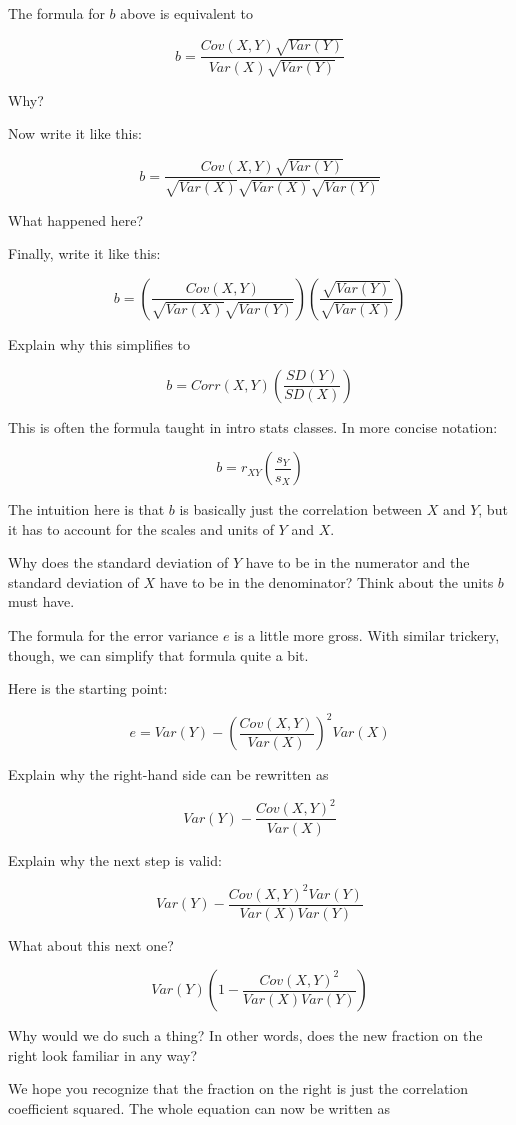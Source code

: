 \documentclass[
]{book}
\begin{document}
The formula for \(b\) above is equivalent to

\[
b = \frac{Cov(X, Y) \sqrt{Var (Y)}}{Var(X)\sqrt{Var(Y)}}
\]

Why?

Now write it like this:

\[
b = \frac{Cov(X, Y) \sqrt{Var (Y)}}{\sqrt{Var(X)}\sqrt{Var(X)}\sqrt{Var(Y)}}
\]

What happened here?

Finally, write it like this:

\[
b = \left(\frac{Cov(X, Y)}{\sqrt{Var(X)} \sqrt{Var(Y)}}\right) \left(\frac{\sqrt{Var(Y)}}{\sqrt{Var(X)}}\right)
\]

Explain why this simplifies to

\[
b = Corr(X, Y)\left(\frac{SD(Y)}{SD(X)}\right)
\]

This is often the formula taught in intro stats classes. In more concise notation:

\[
b = r_{XY}\left(\frac{s_{Y}}{s_{X}}\right)
\]

The intuition here is that \(b\) is basically just the correlation between \(X\) and \(Y\), but it has to account for the scales and units of \(Y\) and \(X\).

Why does the standard deviation of \(Y\) have to be in the numerator and the standard deviation of \(X\) have to be in the denominator? Think about the units \(b\) must have.

The formula for the error variance \(e\) is a little more gross. With similar trickery, though, we can simplify that formula quite a bit.

Here is the starting point:

\[
e = Var(Y) - \left( \frac{Cov(X, Y)}{Var(X)} \right)^2 Var(X)
\]

Explain why the right-hand side can be rewritten as

\[
Var(Y) - \frac{Cov(X, Y)^{2}}{Var(X)}
\]

Explain why the next step is valid:

\[
Var(Y) - \frac{Cov(X, Y)^{2} Var(Y)}{Var(X) Var(Y)}
\]

What about this next one?

\[
Var(Y) \left( 1 - \frac{Cov(X, Y)^{2}}{Var(X) Var(Y)} \right)
\]

Why would we do such a thing? In other words, does the new fraction on the right look familiar in any way?

We hope you recognize that the fraction on the right is just the correlation coefficient squared. The whole equation can now be written as
\end{document}
